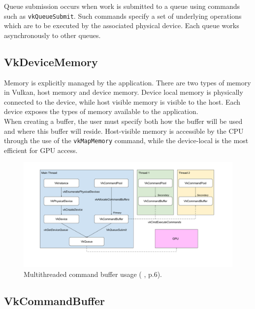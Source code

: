 \documentclass[12pt]{report}
\newcommand{\citediagram}[2]{(\citeauthor{#1} \citeyear{#1}, p.#2)}
\theoremstyle{definition}
\begin{document}
        Queue submission occurs when work is submitted to a queue using commands
        such as \texttt{vkQueueSubmit}. Such commands specify a set of underlying
        operations which are to be executed by the associated physical
        device. Each queue works asynchronously to other queues.

      \subsection{VkDeviceMemory}

        Memory is explicitly managed by the application. There are two types of
        memory in Vulkan, host memory and device memory. Device local memory is
        physically connected to the device, while host visible memory is
        visible to the host. Each device exposes the types of memory available
        to the application. \\

        When creating a buffer, the user must specify both how the buffer will
        be used and where this buffer will reside. Host-visible memory is
        accessible by the CPU through the use of the \texttt{vkMapMemory} command, while
        the device-local is the most efficient for GPU access.

      \begin{figure}[h]
        \centering
        \includegraphics[width=\textwidth]{images/pi_hierarchy.png}
        \caption{Multithreaded command buffer usage \citediagram{personalinquiry}{6}.}
        \label{fig:command_buffer}  
      \end{figure}

      \subsection{VkCommandBuffer}
\end{document}
